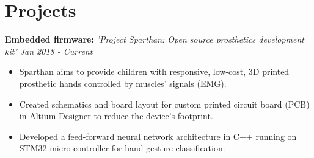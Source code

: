 \documentclass[11pt,letterpaper,sans]{moderncv}
\begin{document}
            

       \vspace{-13pt}
        
    \section{Projects}
    \vspace{-2pt}
        
        \textbf{Embedded firmware:} \textit{'Project Sparthan: Open source prosthetics development kit'
        \hspace*{\fill} Jan 2018 - Current}
        {
        \begin{itemize}
            \item Sparthan aims to provide children with responsive, low-cost, 3D printed prosthetic hands controlled by muscles' signals (EMG).
            \item Created schematics and board layout for custom printed circuit board (PCB) in Altium Designer to reduce the device's footprint.
            \item Developed a feed-forward neural network architecture in C++ running on STM32 micro-controller for hand gesture classification.
        \end{itemize}
        }
        \vspace{2pt}
        
        
\end{document}
